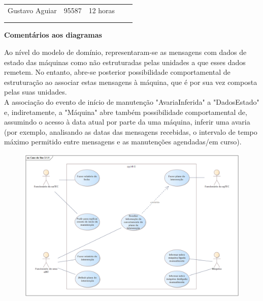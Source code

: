 \documentclass{article}
\begin{document}
\begin{table}[H]
\begin{tabular}{|l|l|l|l|l}
        \multicolumn{1}{|c|}{Gustavo Aguiar}     & \multicolumn{1}{c|}{95587}  & \multicolumn{1}{c|}{12 horas}                     & \multicolumn{1}{l|}{}                   &  \\
        \multicolumn{1}{|l|}{}                   & \multicolumn{1}{l|}{}       & \multicolumn{1}{l|}{}                             & \multicolumn{1}{l|}{}                   &  \\
        \multicolumn{1}{|l|}{}                   & \multicolumn{1}{l|}{}       & \multicolumn{1}{l|}{}                             & \multicolumn{1}{l|}{}                   & \\ \cline{1-4}
        \end{tabular}
        \end{table}

    \vspace{0.5cm}

    \noindent \large \textbf{Comentários aos diagramas}

    \vspace{0.4cm}
    \normalsize

    Ao nível do modelo de domínio, representaram-se as mensagens com dados de estado das máquinas como não estruturadas pelas unidades a que esses dados remetem. No entanto, abre-se posterior possibilidade comportamental de estruturação ao associar estas mensagens à máquina, que é por sua vez composta pelas suas unidades. \\ \indent
    A associação do evento de início de manutenção "AvariaInferida" a "DadosEstado" e, indiretamente, a "Máquina" abre também possibilidade comportamental de, assumindo o acesso à data atual por parte da uma máquina, inferir uma avaria (por exemplo, analisando as datas das mensagens recebidas, o intervalo de tempo máximo permitido entre mensagens e as manutenções agendadas/em curso).

    \pagebreak
    \pdfpageattr\expandafter{\the\pdfpageattr/Rotate -90}

    \begin{figure}[H]
        \centering
        \vspace*{-1.05cm}
        \includegraphics[angle=-90,origin=c,width=\textwidth,height=\textheight,keepaspectratio]{caso_de_uso_311.png}
    \end{figure}
\end{document}
